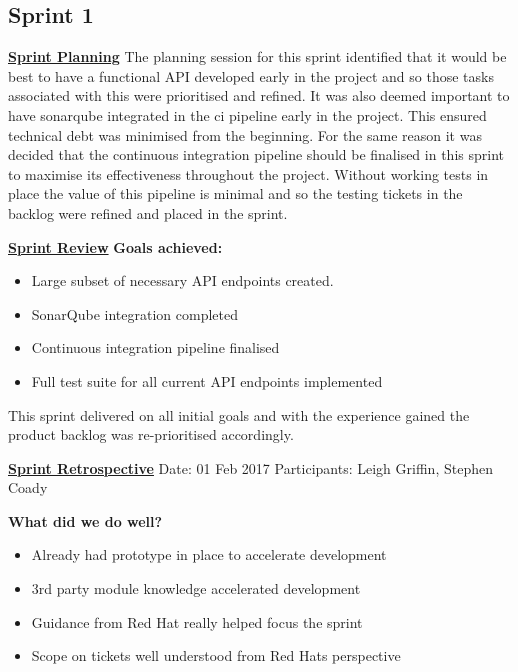 \subsection{Sprint 1}
\underline{\textbf{Sprint Planning}}\newline
The planning session for this sprint identified that it would be best to have a functional API developed early in the project and so those tasks associated with this were prioritised and refined. It was also deemed important to have \gls{sonarqube} integrated in the \gls{ci} pipeline early in the project. This ensured \gls{technical debt} was minimised from the beginning. For the same reason it was decided that the continuous integration pipeline should be finalised in this sprint to maximise its effectiveness throughout the project. Without working tests in place the value of this pipeline is minimal and so the testing tickets in the backlog were refined and placed in the sprint.

\underline{\textbf{Sprint Review}}\newline
\textbf{Goals achieved:}
\begin{itemize}
	\item Large subset of necessary API endpoints created.
	\item SonarQube integration completed
	\item Continuous integration pipeline finalised
	\item Full test suite for all current API endpoints implemented
\end{itemize}

This sprint delivered on all initial goals and with the experience gained the product backlog was re-prioritised accordingly.

\underline{\textbf{Sprint Retrospective}}\newline
Date: 01 Feb 2017\newline
Participants: Leigh Griffin, Stephen Coady

\textbf{What did we do well?}
\begin{itemize}
	\item Already had prototype in place to accelerate development
	\item 3rd party module knowledge accelerated development
	\item Guidance from Red Hat really helped focus the sprint
	\item Scope on tickets well understood from Red Hats perspective
\end{itemize}

